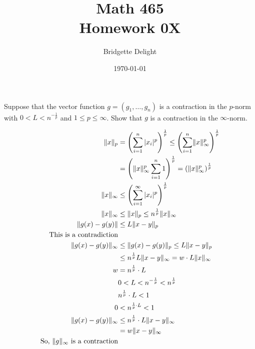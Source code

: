 \documentclass{article}
\title{{\large Math 465}\\ Homework 0X}
\author{Bridgette Delight}
\date{\today}
\DeclarePairedDelimiter{\norm}{\lVert}{\rVert}
\begin{document}

\section{}
Suppose that the vector function $g=(g_1, \dots, g_n)$ is a contraction in the $p$-norm with $0<L<n^{-\frac{1}{p}}$ and $1 \le p \le \infty$. Show that $g$ is a contraction in the $\infty$-norm.

\begin{align*}
    \norm{x}_{p} &= \left( \sum_{i=1}^n |x_i|^p \right)^{\frac{1}{p}} \le \left( \sum_{i=1}^n\norm{x}_{\infty}^p \right)^{\frac{1}{p}} \\
    &= \left(\norm{x}_{\infty}^p \sum_{i=1}^n  1 \right)^{\frac{1}{p}}= \left( \norm{x}_{\infty}^p  \right)^{\frac{1}{p}}\\
    \norm{x}_{\infty} &\le  \left( \sum_{i=1}^{\infty} | x_i |^p \right)^{\frac{1}{p}} \\
    \norm{x}_{\infty}& \le  \norm{x}_{p} \le n^{\frac{1}{p}} \norm{x}_{\infty}\\
    \norm{g(x)- g(y)} & \le L \norm{x-y}_p \\
    \text{This is a contradiction}&\\
    \norm{g(x)- g(y)}_{\infty} & \le \norm{g(x)-g(y)}_p \le L \norm{x-y}_p \\
    &\le n^{\frac{1}{p}} L \norm{x-y}_{\infty} = w\cdot L \norm{x}_{\infty}\\
    w &= n^{\frac{1}{p}} \cdot L \\
    &0 < L < n^{-\frac{1}{p}}<n^{\frac{1}{p}}\\
    &n^{\frac{1}{p}} \cdot L < 1\\
    0 &< n^{\frac{1}{p}\cdot L}<1\\
    \norm{g(x) - g(y)}_{\infty} & \le n^{\frac{1}{p}} \cdot L \norm{x - y}_{\infty}\\
    &= w \norm{ x - y }_{\infty} \\
    \text{So, $\norm{g}_{\infty}$ is a contraction}&\\
\end{align*}
\end{document}

